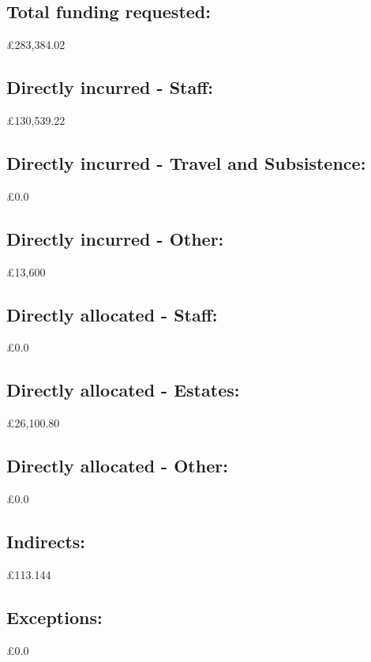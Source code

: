 \subsection{Total funding requested:} £283,384.02

\subsection{Directly incurred - Staff:} £130,539.22

\subsection{Directly incurred - Travel and Subsistence:} £0.0

\subsection{Directly incurred - Other:} £13,600

\subsection{Directly allocated - Staff:} £0.0

\subsection{Directly allocated - Estates:} £26,100.80

\subsection{Directly allocated - Other:} £0.0

\subsection{Indirects:} £113.144

\subsection{Exceptions:} £0.0

